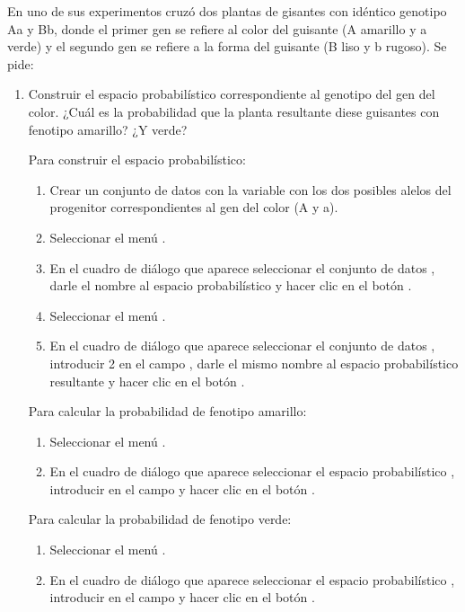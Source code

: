 \begin{enumerate}[leftmargin=*]
{En uno de sus experimentos cruzó dos plantas de gisantes con idéntico genotipo Aa y Bb, donde el primer gen se refiere al color del guisante
(A amarillo y a verde) y el segundo gen se refiere a la forma del guisante (B liso y b rugoso). Se pide:
\begin{enumerate}
\item Construir el espacio probabilístico correspondiente al genotipo del gen del color. 
¿Cuál es la probabilidad que la planta resultante diese guisantes con fenotipo amarillo? 
¿Y verde?
\begin{indicacion}
Para construir el espacio probabilístico: 
\begin{enumerate}
\item Crear un conjunto de datos  con la variable  con los dos posibles alelos del
progenitor correspondientes al gen del color (A y a).
\item Seleccionar el menú .
\item En el cuadro de diálogo que aparece seleccionar el conjunto de datos , darle el nombre
 al espacio probabilístico y hacer clic en el botón .
\item Seleccionar el menú .
\item En el cuadro de diálogo que aparece seleccionar el conjunto de datos , introducir 2 en el campo
, darle el mismo nombre al espacio probabilístico resultante y hacer clic en el botón . 
\end{enumerate}
Para calcular la probabilidad de fenotipo amarillo:
\begin{enumerate}
\item Seleccionar el menú .
\item En el cuadro de diálogo que aparece seleccionar el espacio probabilístico , introducir
 en el campo  y hacer clic en el
botón .
\end{enumerate}
Para calcular la probabilidad de fenotipo verde:
\begin{enumerate}
\item Seleccionar el menú .
\item En el cuadro de diálogo que aparece seleccionar el espacio probabilístico , introducir
 en el campo  y hacer clic en el
botón .
\end{enumerate}
\end{indicacion}


\end{enumerate}}
\end{enumerate}
